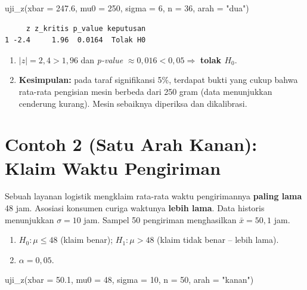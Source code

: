 \documentclass[
  indonesian,
  letterpaper,
]{book}
\newenvironment{Shaded}{\begin{snugshade}}{\end{snugshade}}
\newcommand{\AttributeTok}[1]{\textcolor[rgb]{0.40,0.45,0.13}{#1}}
\newcommand{\DecValTok}[1]{\textcolor[rgb]{0.68,0.00,0.00}{#1}}
\newcommand{\FloatTok}[1]{\textcolor[rgb]{0.68,0.00,0.00}{#1}}
\newcommand{\FunctionTok}[1]{\textcolor[rgb]{0.28,0.35,0.67}{#1}}
\newcommand{\NormalTok}[1]{\textcolor[rgb]{0.00,0.23,0.31}{#1}}
\newcommand{\StringTok}[1]{\textcolor[rgb]{0.13,0.47,0.30}{#1}}
\providecommand{\tightlist}{%
  \setlength{\itemsep}{0pt}\setlength{\parskip}{0pt}}
\begin{document}
\begin{Shaded}
\begin{Highlighting}[]
\FunctionTok{uji\_z}\NormalTok{(}\AttributeTok{xbar =} \FloatTok{247.6}\NormalTok{, }\AttributeTok{mu0 =} \DecValTok{250}\NormalTok{, }\AttributeTok{sigma =} \DecValTok{6}\NormalTok{, }\AttributeTok{n =} \DecValTok{36}\NormalTok{, }\AttributeTok{arah =} \StringTok{"dua"}\NormalTok{)}
\end{Highlighting}
\end{Shaded}

\begin{verbatim}
     z z_kritis p_value keputusan
1 -2.4     1.96  0.0164  Tolak H0
\end{verbatim}

\begin{enumerate}
\def\labelenumi{\arabic{enumi}.}
\setcounter{enumi}{3}
\tightlist
\item
  \(\lvert z \rvert = 2{,}4 > 1{,}96\) dan \emph{p-value}
  \(\approx 0{,}016 < 0{,}05 \Rightarrow\) \textbf{tolak \(H_0\)}.
\item
  \textbf{Kesimpulan:} pada taraf signifikansi 5\%, terdapat bukti yang
  cukup bahwa rata-rata pengisian mesin berbeda dari 250 gram (data
  menunjukkan cenderung kurang). Mesin sebaiknya diperiksa dan
  dikalibrasi.
\end{enumerate}

\section{Contoh 2 (Satu Arah Kanan): Klaim Waktu
Pengiriman}\label{contoh-2-satu-arah-kanan-klaim-waktu-pengiriman}

Sebuah layanan logistik mengklaim rata-rata waktu pengirimannya
\textbf{paling lama} 48 jam. Asosiasi konsumen curiga waktunya
\textbf{lebih lama}. Data historis menunjukkan \(\sigma = 10\) jam.
Sampel 50 pengiriman menghasilkan \(\bar{x} = 50{,}1\) jam.

\begin{enumerate}
\def\labelenumi{\arabic{enumi}.}
\tightlist
\item
  \(H_0: \mu \leq 48\) (klaim benar); \(H_1: \mu > 48\) (klaim tidak
  benar -- lebih lama).
\item
  \(\alpha = 0{,}05\).
\end{enumerate}

\begin{Shaded}
\begin{Highlighting}[]
\FunctionTok{uji\_z}\NormalTok{(}\AttributeTok{xbar =} \FloatTok{50.1}\NormalTok{, }\AttributeTok{mu0 =} \DecValTok{48}\NormalTok{, }\AttributeTok{sigma =} \DecValTok{10}\NormalTok{, }\AttributeTok{n =} \DecValTok{50}\NormalTok{, }\AttributeTok{arah =} \StringTok{"kanan"}\NormalTok{)}
\end{Highlighting}
\end{Shaded}
\end{document}
